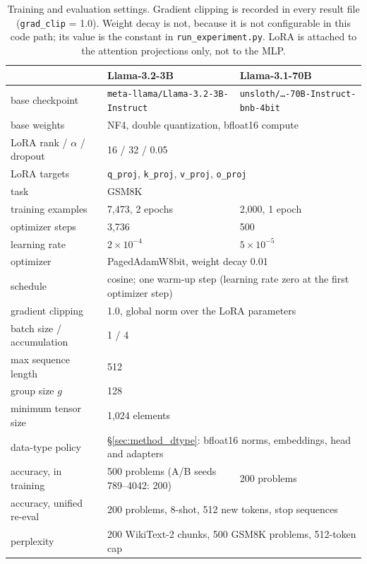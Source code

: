 \documentclass[11pt,letterpaper]{article}
\begin{document}
\begin{table}[htbp]
\centering
\small
\caption{Training and evaluation settings. Gradient clipping is recorded in every result file (\texttt{grad\_clip} = 1.0). Weight decay is not, because it is not configurable in this code path; its value is the constant in \texttt{run\_experiment.py}. LoRA is attached to the attention projections only, not to the MLP.}
\label{tab:hyper}
\setlength{\tabcolsep}{4pt}
\begin{tabular}{lll}
\toprule
& Llama-3.2-3B & Llama-3.1-70B \\
\midrule
base checkpoint & \texttt{\scriptsize meta-llama/Llama-3.2-3B-Instruct}
                & \texttt{\scriptsize unsloth/\dots-70B-Instruct-bnb-4bit} \\
base weights    & \multicolumn{2}{l}{NF4, double quantization, bfloat16 compute} \\
\midrule
LoRA rank / $\alpha$ / dropout & \multicolumn{2}{l}{16 / 32 / 0.05} \\
LoRA targets    & \multicolumn{2}{l}{\texttt{q\_proj}, \texttt{k\_proj}, \texttt{v\_proj}, \texttt{o\_proj}} \\
\midrule
task            & \multicolumn{2}{l}{GSM8K} \\
training examples & 7{,}473, 2 epochs & 2{,}000, 1 epoch \\
optimizer steps & 3{,}736 & 500 \\
learning rate   & $2\times10^{-4}$ & $5\times10^{-5}$ \\
optimizer       & \multicolumn{2}{l}{PagedAdamW8bit, weight decay 0.01} \\
schedule        & \multicolumn{2}{l}{cosine; one warm-up step (learning rate zero at the first optimizer step)} \\
gradient clipping & \multicolumn{2}{l}{1.0, global norm over the LoRA parameters} \\
batch size / accumulation & \multicolumn{2}{l}{1 / 4} \\
max sequence length & \multicolumn{2}{l}{512} \\
\midrule
group size $g$  & \multicolumn{2}{l}{128} \\
minimum tensor size & \multicolumn{2}{l}{1{,}024 elements} \\
data-type policy & \multicolumn{2}{l}{\S\ref{sec:method_dtype}: bfloat16 norms, embeddings, head and adapters} \\
\midrule
accuracy, in training & 500 problems (A/B seeds 789--4042: 200) & 200 problems \\
accuracy, unified re-eval & \multicolumn{2}{l}{200 problems, 8-shot, 512 new tokens, stop sequences} \\
perplexity      & \multicolumn{2}{l}{200 WikiText-2 chunks, 500 GSM8K problems, 512-token cap} \\
\bottomrule
\end{tabular}
\end{table}
\end{document}
